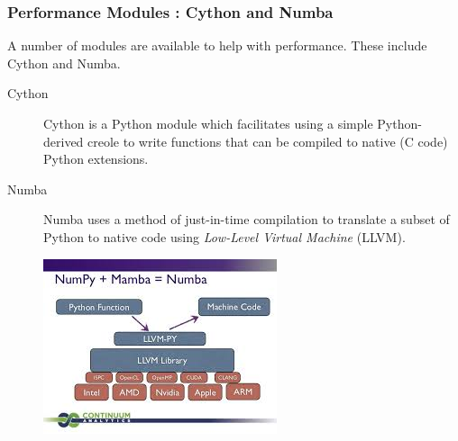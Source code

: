 \documentclass[MASTER.tex]{subfiles}
\begin{document}
\begin{frame}
	
	\large
\frametitle{Performance Modules : Cython and Numba}
A number of modules are available to help with performance. These include Cython and Numba.

\begin{description}
	\item[Cython] Cython
	is a Python module which facilitates using a simple Python-derived creole to write functions that can be
	compiled to native (C code) Python extensions. 
	
	
	\item[Numba] 
	Numba uses a method of just-in-time compilation to
	translate a subset of Python to native code using \textit{Low-Level Virtual Machine} (LLVM).
\end{description} 

\end{frame}
\begin{frame}
	\begin{figure}
\centering
\includegraphics[width=0.99\linewidth]{numba}

\end{figure}

\end{frame}
\end{document}

